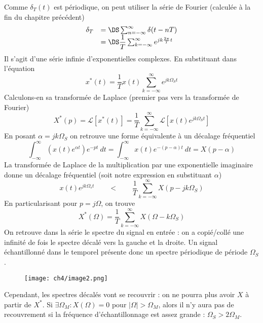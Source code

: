 	Comme $\delta_T(t)$ est périodique, on peut utiliser la série de Fourier (calculée à la fin 
	du chapitre précédent)
	\begin{equation}
	\begin{array}{ll}
	\delta_T &=\DS \sum_{n=-\infty}^\infty \delta(t-nT)\\
	&= \DS \dfrac{1}{T}\sum_{k=-\infty}^\infty e^{jk\frac{2\pi}{T}t}
	\end{array}
	\end{equation}
	Il s'agit d'une série infinie d'exponentielles complexes. En substituant dans l'équation
	\begin{equation}
	x^*(t) = \frac{1}{T}x(t)\sum_{k=-\infty}^\infty e^{jk\Omega_St}
	\end{equation}
	Calculons-en sa transformée de Laplace (premier pas vers la transformée de Fourier)
	\begin{equation}
	X^*(p) = \mathcal{L}[x^*(t)] = \dfrac{1}{T}\sum_{k=-\infty}^\infty \mathcal{L}\left[x(t)
	e^{jk\Omega_St}\right]
	\end{equation}
	En posant $\alpha = jk\Omega_S$ on retrouve une forme équivalente à un décalage fréquentiel
	\begin{equation}
	\int_{-\infty}^\infty \left(x(t)e^{\alpha t}\right)e^{-pt}\ dt = \int_{-\infty}^\infty x(t) 
	e^{-(p-\alpha)t}\ dt = X(p-\alpha)
	\end{equation}
	La transformée de Laplace de la multiplication par une exponentielle imaginaire donne un 
	décalage fréquentiel (soit notre expression en substituant $\alpha$)
	\begin{equation}
	x(t)e^{jk\Omega_st}\qquad \lt\qquad \frac{1}{T}\sum_{k=-\infty}^\infty X(p-jk\Omega_S)
	\end{equation}
	En particularisant pour $p = j\Omega$, on trouve
	\begin{equation}
	X^*(\Omega) = \dfrac{1}{T}\sum_{k=-\infty}^\infty X(\Omega-k\Omega_S)
	\end{equation}
	On retrouve dans la série le spectre du signal en entrée : on a copié/collé une infinité 
	de fois le spectre décalé vers la gauche et la droite. Un signal échantillonné dans le temporel 
	présente donc un spectre périodique de période $\Omega_S$.
	\begin{wrapfigure}[10]{l}{8.5cm}
	\vspace{-5mm}
	\texttt{[image: ch4/image2.png]}
	\label{fig:rec}
	\end{wrapfigure}	
	Cependant, les spectres décalés vont se recouvrir : on ne pourra plus avoir $X$ à partir 
	de $X^*$. Si $\exists \Omega_M : X(\Omega) = 0$ pour $|\Omega|>\Omega_M$, alors il n'y aura 
	pas de recouvrement si la fréquence d’échantillonnage est assez grande : $\Omega_S > 2\Omega_M$.\\
	
